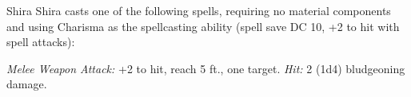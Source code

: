 \documentclass[10pt,a4paper,twoside,twocolumn,openany,nodeprecatedcode]{dndbook}
\begin{document}
\begin{DndMonster}[float=ht]{Shira}
\DndMonsterBasics[
armor-class = {10},
hit-points = {\DndDice{1d8}},
speed = {30 ft.}
]
\DndMonsterAbilityScores[
 str = 10,
 dex = 10,
 con = 10,
 int = 10,
 wis = 10,
 cha = 10
]
\DndMonsterDetails[
languages = {Any one language (usually Common)},
challenge = 0,
]
Shira casts one of the following spells, requiring no material components and using Charisma as the spellcasting ability (spell save DC 10, +2 to hit with spell attacks):
\begin{DndMonsterSpells}
\end{DndMonsterSpells}
\par
{}
\textsl{Melee Weapon Attack:} +2 to hit, reach 5 ft., one target. \textsl{Hit:} 2 (1d4) bludgeoning damage.

\end{DndMonster}


\clearpage
{}
\end{document}
